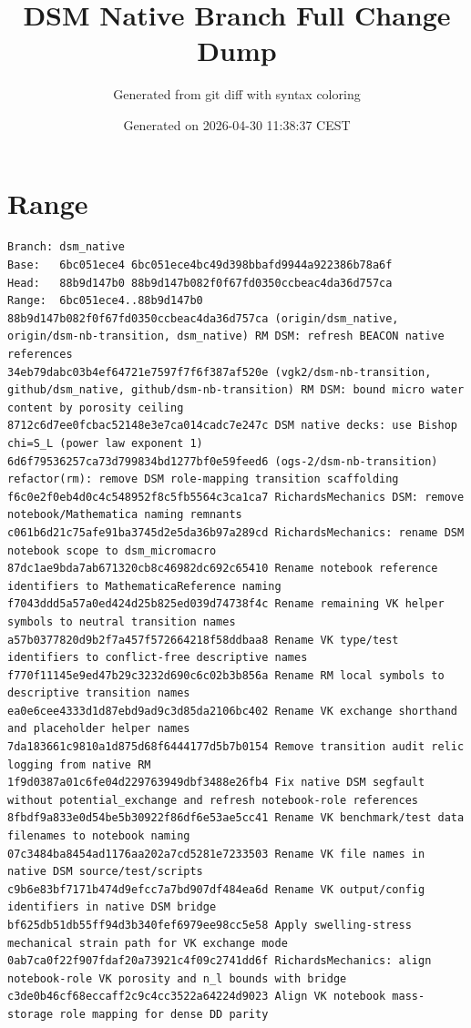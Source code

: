 \documentclass[10pt]{article}
\title{DSM Native Branch Full Change Dump}
\author{Generated from git diff with syntax coloring}
\date{Generated on 2026-04-30 11:38:37 CEST}
\begin{document}
\maketitle
\section*{Range}
\begin{lstlisting}
Branch: dsm_native
Base:   6bc051ece4 6bc051ece4bc49d398bbafd9944a922386b78a6f
Head:   88b9d147b0 88b9d147b082f0f67fd0350ccbeac4da36d757ca
Range:  6bc051ece4..88b9d147b0
88b9d147b082f0f67fd0350ccbeac4da36d757ca (origin/dsm_native, origin/dsm-nb-transition, dsm_native) RM DSM: refresh BEACON native references
34eb79dabc03b4ef64721e7597f7f6f387af520e (vgk2/dsm-nb-transition, github/dsm_native, github/dsm-nb-transition) RM DSM: bound micro water content by porosity ceiling
8712c6d7ee0fcbac52148e3e7ca014cadc7e247c DSM native decks: use Bishop chi=S_L (power law exponent 1)
6d6f79536257ca73d799834bd1277bf0e59feed6 (ogs-2/dsm-nb-transition) refactor(rm): remove DSM role-mapping transition scaffolding
f6c0e2f0eb4d0c4c548952f8c5fb5564c3ca1ca7 RichardsMechanics DSM: remove notebook/Mathematica naming remnants
c061b6d21c75afe91ba3745d2e5da36b97a289cd RichardsMechanics: rename DSM notebook scope to dsm_micromacro
87dc1ae9bda7ab671320cb8c46982dc692c65410 Rename notebook reference identifiers to MathematicaReference naming
f7043ddd5a57a0ed424d25b825ed039d74738f4c Rename remaining VK helper symbols to neutral transition names
a57b0377820d9b2f7a457f572664218f58ddbaa8 Rename VK type/test identifiers to conflict-free descriptive names
f770f11145e9ed47b29c3232d690c6c02b3b856a Rename RM local symbols to descriptive transition names
ea0e6cee4333d1d87ebd9ad9c3d85da2106bc402 Rename VK exchange shorthand and placeholder helper names
7da183661c9810a1d875d68f6444177d5b7b0154 Remove transition audit relic logging from native RM
1f9d0387a01c6fe04d229763949dbf3488e26fb4 Fix native DSM segfault without potential_exchange and refresh notebook-role references
8fbdf9a833e0d54be5b30922f86df6e53ae5cc41 Rename VK benchmark/test data filenames to notebook naming
07c3484ba8454ad1176aa202a7cd5281e7233503 Rename VK file names in native DSM source/test/scripts
c9b6e83bf7171b474d9efcc7a7bd907df484ea6d Rename VK output/config identifiers in native DSM bridge
bf625db51db55ff94d3b340fef6979ee98cc5e58 Apply swelling-stress mechanical strain path for VK exchange mode
0ab7ca0f22f907fdaf20a73921c4f09c2741dd6f RichardsMechanics: align notebook-role VK porosity and n_l bounds with bridge
c3de0b46cf68eccaff2c9c4cc3522a64224d9023 Align VK notebook mass-storage role mapping for dense DD parity

\end{lstlisting}
\end{document}
